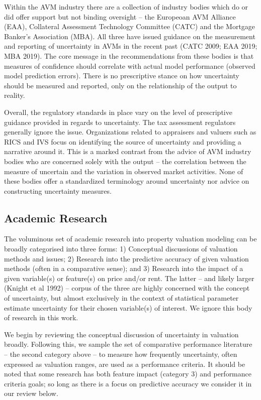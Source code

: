 \documentclass[colTwo]{anon}
\theoremstyle{definition}
\begin{document}
Within the AVM industry there are a collection of industry bodies which do or did offer support but not binding oversight -- the Europeoan AVM Alliance (EAA), Collateral Assessment Technology Committee (CATC) and the Mortgage Banker's Association (MBA). All three have issued guidance on the measurement and reporting of uncertainty in AVMs in the recent past (CATC 2009; EAA 2019; MBA 2019).  The core message in the recommendations from these bodies is that measures of confidence should correlate with actual model performance (observed model prediction errors). There is no prescriptive stance on how uncertainty should be measured and reported, only on the relationship of the output to reality.

Overall, the regulatory standards in place vary on the level of prescriptive guidance provided in regards to uncertainty.  The tax assessment regulators generally ignore the issue. Organizations related to appraisers and valuers such as RICS and IVS focus on identifying the source of uncertainty and providing a narrative around it.  This is a marked contrast from the advice of AVM industry bodies who are concerned solely with the output -- the correlation between the measure of uncertain and the variation in observed market activities. None of these bodies offer a standardized terminology around uncertainty nor advice on constructing uncertainty measures.

\subsection{Academic Research}

The voluminous set of academic research into property valuation modeling can be broadly categorised into three forms: 1) Conceptual discussions of valuation methods and issues; 2) Research into the predictive accuracy of given valuation methods (often in a comparative sense); and  3) Research into the impact of a given variable(s) or feature(s) on price and/or rent.  The latter -- and likely larger (Knight et al 1992) -- corpus of the three are highly concerned with the concept of uncertainty, but almost exclusively in the context of statistical parameter estimate uncertainty for their chosen variable(s) of interest. We ignore this body of research in this work.

We begin by reviewing the conceptual discussion of uncertainty in valuation broadly.  Following this, we sample the set of comparative performance literature -- the second category above -- to measure how frequently uncertainty, often expressed as valuation ranges, are used as a performance criteria. It should be noted that some research has both feature impact (category 3) and performance criteria goals; so long as there is a focus on predictive accuracy we consider it in our review below.
\end{document}
